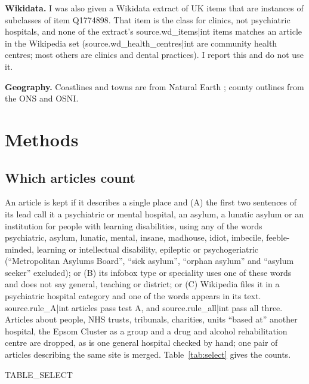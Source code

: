 \documentclass[11pt,a4paper]{article}
\begin{document}
\textbf{Wikidata.} I was also given a Wikidata extract of UK items that are instances of subclasses of item Q1774898. That item is the class for clinics, not psychiatric hospitals, and none of the extract's {{source.wd_items|int}} items matches an article in the Wikipedia set ({{source.wd_health_centres|int}} are community health centres; most others are clinics and dental practices). I report this and do not use it.

\textbf{Geography.} Coastlines and towns are from Natural Earth \citep{naturalearth}; county outlines from the ONS and OSNI.

\section{Methods}
\subsection{Which articles count}
An article is kept if it describes a single place and (A) the first two sentences of its lead call it a psychiatric or mental hospital, an asylum, a lunatic asylum or an institution for people with learning disabilities, using any of the words psychiatric, asylum, lunatic, mental, insane, madhouse, idiot, imbecile, feeble-minded, learning or intellectual disability, epileptic or psychogeriatric (``Metropolitan Asylums Board'', ``sick asylum'', ``orphan asylum'' and ``asylum seeker'' excluded); or (B) its infobox type or speciality uses one of these words and does not say general, teaching or district; or (C) Wikipedia files it in a psychiatric hospital category and one of the words appears in its text. {{source.rule_A|int}} articles pass test A, and {{source.rule_all|int}} pass all three. Articles about people, NHS trusts, tribunals, charities, units ``based at'' another hospital, the Epsom Cluster as a group and a drug and alcohol rehabilitation centre are dropped, as is one general hospital checked by hand; one pair of articles describing the same site is merged. Table~\ref{tab:select} gives the counts.

{{TABLE_SELECT}}
\end{document}
